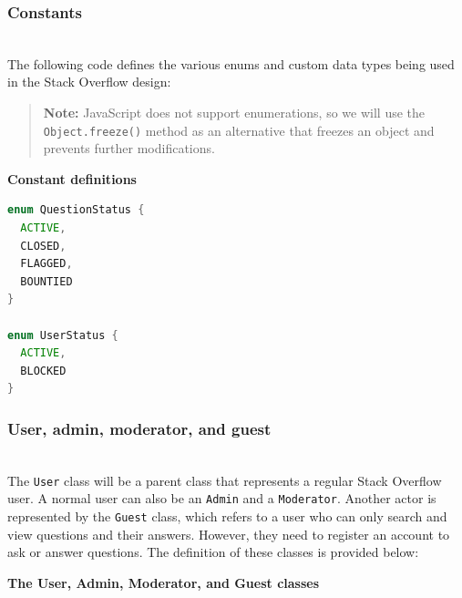 \subsubsection{Constants}\label{YlMdA5Xd5mvd7O_iwtTJn}
\\
The following code defines the various enums and custom data types being used in the Stack Overflow design:
\begin{quote}
\textbf{Note:} JavaScript does not support enumerations, so we will use the \texttt{Object.freeze()} method as an alternative that freezes an object and prevents further modifications.
\end{quote}

\textbf{Constant definitions}

\begin{lstlisting}[language=Java]
enum QuestionStatus {
  ACTIVE, 
  CLOSED,
  FLAGGED,
  BOUNTIED
}

enum UserStatus {
  ACTIVE,
  BLOCKED
}
\end{lstlisting}

\subsubsection{User, admin, moderator, and guest}\label{a-GjKp6-VT6SMnzmDC3jh}
\\
The \texttt{User} class will be a parent class that represents a regular Stack Overflow user. A normal user can also be an \texttt{Admin} and a \texttt{Moderator}. Another actor is represented by the \texttt{Guest} class, which refers to a user who can only search and view questions and their answers. However, they need to register an account to ask or answer questions. The definition of these classes is provided below:

\textbf{The User, Admin, Moderator, and Guest classes}

